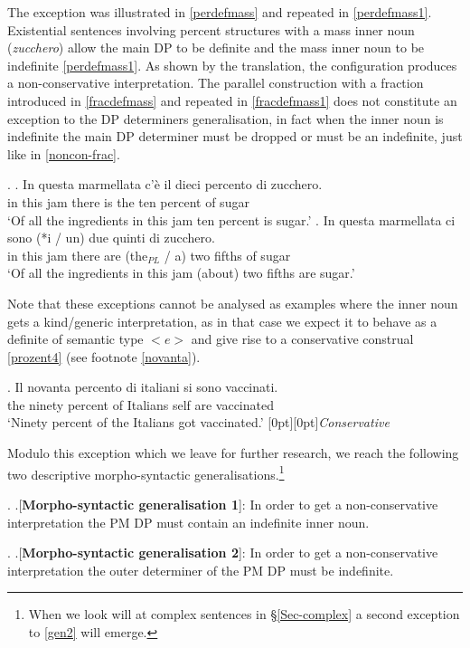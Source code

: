 \documentclass[charis, linguex]{glossa}
\newcommand{\rcommentg}[1]{\hfill\raisebox{1.9\baselineskip}[0pt][0pt]{#1}}
\begin{document}
The exception was illustrated in \ref{perdefmass} and repeated in \ref{perdefmass1}. Existential sentences involving percent structures with a mass inner noun (\textit{zucchero}) allow the main DP to be definite and the mass inner noun to be indefinite \ref{perdefmass1}. As shown by the translation, the configuration produces a non-conservative interpretation. The parallel construction with a fraction introduced in \ref{fracdefmass} and repeated in \ref{fracdefmass1} does not constitute an exception to the DP determiners generalisation, in fact when the inner noun is indefinite the main DP determiner must be dropped or must be an indefinite, just like in \ref{noncon-frac}.

	\ex. \ag. In questa marmellata c'\`{e} il dieci percento di zucchero. \\ 
	      in this jam {there is} the ten percent of sugar \\ 
		\glt  `Of all the ingredients in this jam ten percent is sugar.' \label{perdefmass1}
		\bg. In questa marmellata ci sono (*i / un) due quinti di zucchero. \\ 
	      in this jam there are (the$_{PL}$ / a) two fifths of sugar \\ 
		 \glt `Of all the ingredients in this jam (about) two fifths are sugar.' \label{fracdefmass1} 
		 
Note that these exceptions cannot be analysed as examples where the inner noun gets a kind/generic interpretation, as in that case we expect it to behave as a definite of semantic type $<e>$ and give rise to a conservative construal \ref{prozent4} (see footnote \ref{novanta}).

\exg. Il novanta percento di italiani si sono vaccinati. \\
      the ninety percent of Italians self are vaccinated \\
      \glt `Ninety percent of the Italians got vaccinated.'  \label{prozent4}\rcommentg{\textit{Conservative}}



Modulo this exception which we leave for further research, we reach the following two descriptive morpho-syntactic generalisations.\footnote{When we look will at complex sentences in \S\ref{Sec-complex} a second exception to \ref{gen2} will emerge.}


\ex. \label{gen1} \a.[{\bf Morpho-syntactic generalisation 1}]: In order to get a non-conservative interpretation the PM DP must contain an indefinite inner noun.

\ex. \label{gen2} \a.[{\bf Morpho-syntactic generalisation 2}]: In order to get a non-conservative interpretation the outer determiner of the PM DP must be indefinite.
\end{document}
